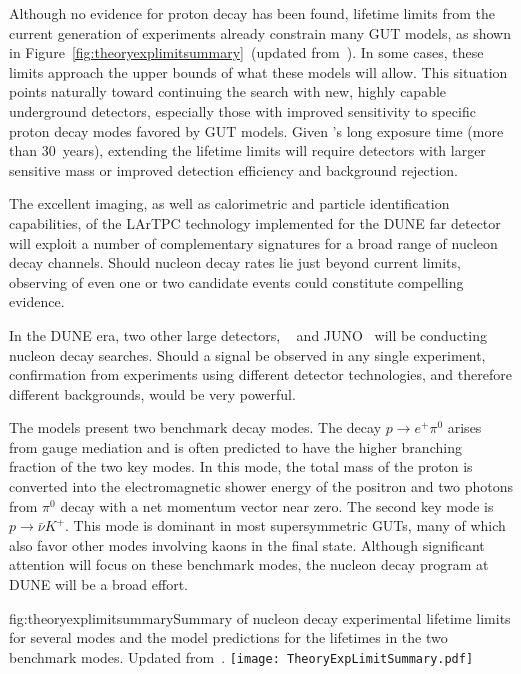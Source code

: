 Although no evidence for proton decay has been found, lifetime limits from the current generation of experiments already constrain many GUT models, as shown in Figure~\ref{fig:theoryexplimitsummary}~(updated from~\cite{Babu:2013jba}). In some cases, these limits  approach the upper bounds of what these models will allow. This situation points naturally toward continuing the search with new, highly capable underground detectors, especially those with improved sensitivity to specific proton decay modes favored by GUT models. Given \superk's long exposure time (more than 30~years), extending the lifetime limits will require detectors with larger sensitive mass or improved detection efficiency and background rejection.  

The excellent imaging, as well as calorimetric and particle identification capabilities, of the LArTPC technology  implemented for the DUNE far detector will exploit a number of complementary signatures for a broad range of nucleon decay channels.  Should nucleon decay rates lie just beyond current limits, observing of even one or two candidate events could constitute compelling evidence.

In the DUNE era, two other large detectors, \hyperk~\cite{Abe:2018uyc} and JUNO~\cite{Djurcic:2015vqa} will be conducting nucleon decay searches. Should a signal be observed in any single experiment, confirmation from experiments using different detector technologies, and therefore different backgrounds, would be very powerful.

The models present two benchmark decay modes.  The decay $p \rightarrow e^{+}\pi^0$ arises from gauge mediation and is often predicted to have the higher branching fraction of the two key modes. In this mode, the total mass of the proton is converted into the electromagnetic shower energy of the positron and two photons from $\pi^0$ decay with a net momentum vector near zero. 
The second key mode is $p \rightarrow \bar{\nu}K^{+}$. This mode is dominant in most supersymmetric GUTs, many of which also favor other modes involving kaons in the final state.
Although significant attention will focus on these benchmark modes, the nucleon decay program at DUNE will be a broad effort.

\begin{dunefigure}{fig:theoryexplimitsummary}{Summary of nucleon decay experimental lifetime limits for several modes and the model predictions for the lifetimes in the two benchmark modes. Updated from~\cite{Babu:2013jba}.}
\texttt{[image: TheoryExpLimitSummary.pdf]}
\end{dunefigure}

